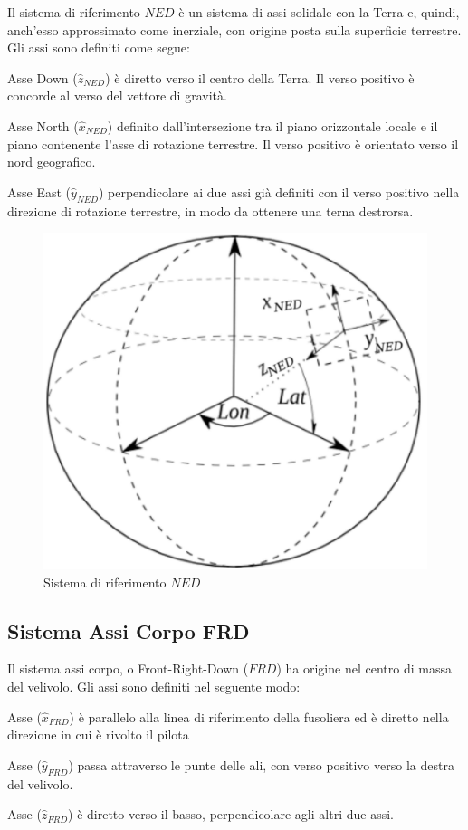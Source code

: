 Il sistema di riferimento $NED$ è un sistema di assi solidale con la Terra e, quindi, anch'esso approssimato come inerziale, con origine posta sulla superficie terrestre. Gli assi sono definiti come segue:
\begin{sitemize}
    \item Asse Down ($\hat{z}_{NED}$) è diretto verso il centro della Terra. Il verso positivo è concorde al verso del vettore di gravità.
    \item Asse North ($\hat{x}_{NED}$) definito dall'intersezione tra il piano orizzontale locale e il piano contenente l'asse di rotazione terrestre. Il verso positivo è orientato verso il nord geografico.
    \item Asse East ($\hat{y}_{NED}$) perpendicolare ai due assi già definiti con il verso positivo nella direzione di rotazione terrestre, in modo da ottenere una terna destrorsa.
\end{sitemize}

\begin{figure}[H]
    \centering
    \includegraphics[width=0.4\linewidth]{Immagini/NED.jpg}
    \caption{Sistema di riferimento $NED$ \cite{mscthesis:uav}}
\end{figure}


\subsection{Sistema Assi Corpo FRD}

Il sistema assi corpo, o Front-Right-Down ($FRD$) ha origine nel centro di massa del velivolo. Gli assi sono definiti nel seguente modo:

\begin{sitemize}
    \item Asse ($\hat{x}_{FRD}$) è parallelo alla linea di riferimento della fusoliera ed è diretto nella direzione in cui è rivolto il pilota
    \item Asse ($\hat{y}_{FRD}$) passa attraverso le punte delle ali, con verso positivo verso la destra del velivolo.
    \item Asse ($\hat{z}_{FRD}$) è diretto verso il basso, perpendicolare agli altri due assi.
\end{sitemize}


